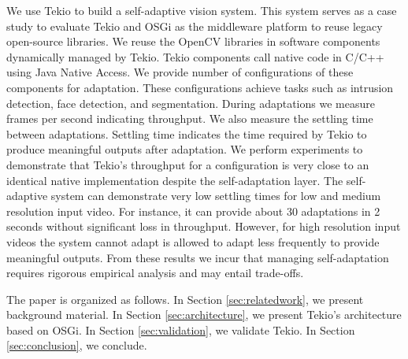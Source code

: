 We use Tekio to build a self-adaptive vision system. This system serves as a case study to evaluate Tekio and OSGi as the middleware platform to reuse legacy open-source libraries. We reuse the OpenCV libraries in software components dynamically managed by Tekio. Tekio components call native code in C/C++ using Java Native Access. We provide number of configurations of these components for adaptation. These configurations achieve tasks such as intrusion detection, face detection, and segmentation. During adaptations we measure frames per second indicating throughput. We also measure the settling time between adaptations. Settling time indicates the time required by Tekio to produce meaningful outputs after adaptation. We perform experiments to demonstrate that Tekio's throughput for a configuration is very close to an identical native implementation despite the self-adaptation layer. The self-adaptive system can demonstrate very low settling times for low and medium resolution input video. For instance, it can provide about 30 adaptations in 2 seconds without significant loss in throughput. However, for high resolution input videos the system cannot adapt is allowed to adapt less frequently to provide meaningful outputs. From these results we incur that managing  self-adaptation requires rigorous empirical analysis and may entail trade-offs.

The paper is organized as follows. In Section \ref{sec:relatedwork}, we present background material. In Section \ref{sec:architecture}, we present Tekio's architecture based on OSGi. In Section \ref{sec:validation}, we validate Tekio. In Section \ref{sec:conclusion}, we conclude.